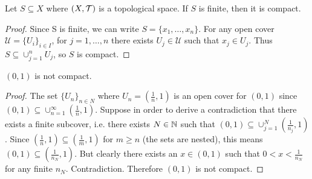 \documentclass{article}
\begin{document}
\begin{example}
Let $S\subseteq X$ where $(X,\mathcal{T})$ is a topological space. If $S$ is finite, then it is compact. 
\end{example}
\begin{proof}
Since S is finite, we can write $S = \{ x_1, \ldots, x_n\}$. For any open cover $\mathcal{U} = \{ U_i \}_{i\in I}$, for $j=1,\ldots,n$ there exists $U_j \in \mathcal{U}$ such that $x_j \in U_j$. Thus $S \subseteq \cup_{j=1}^n U_j$, so $S$ is compact.
\end{proof}

\begin{example}
$(0,1)$ is not compact.
\end{example}
\begin{proof}
The set $\{U_n\}_{n \in N}$ where $U_n = \left(\frac{1}{n},1\right)$ is an open cover for $(0,1)$ since $(0,1) \subseteq \cup_{n=1}^\infty \left(\frac{1}{n},1\right)$. Suppose in order to derive a contradiction that there exists a finite subcover, i.e. there exists $N \in {\mathbb{N}}$ such that $(0,1) \subseteq \cup_{j=1}^N \left(\frac{1}{n_j},1\right)$. Since $\left(\frac{1}{n},1\right) \subseteq \left(\frac{1}{m},1\right)$ for $m \geq n$ (the sets are nested), this means $(0,1) \subseteq  \left(\frac{1}{n_N},1\right)$. But clearly there exists an $x \in (0,1)$ such that $0 < x < \frac{1}{n_N}$ for any finite $n_N$. Contradiction. Therefore $(0,1)$ is not compact.
\end{proof}
\end{document}
